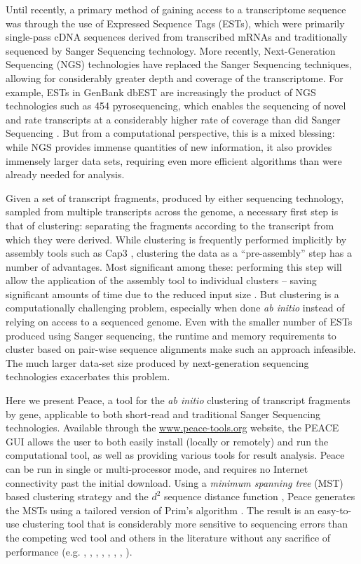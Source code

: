 \documentclass[a4,center,fleqn]{NAR}
\begin{document}
Until recently, a primary method of gaining access to a transcriptome
sequence was through the use of Expressed Sequence Tags (ESTs), which
were primarily single-pass cDNA sequences derived from transcribed
mRNAs and traditionally sequenced by Sanger Sequencing technology.
More recently, Next-Generation Sequencing (NGS) technologies have
replaced the Sanger Sequencing techniques, allowing for considerably
greater depth and coverage of the transcriptome.  For example, ESTs in
GenBank dbEST are increasingly the product of NGS technologies such as
454 pyrosequencing, which enables the sequencing of novel and rate
transcripts at a considerably higher rate of coverage than did Sanger
Sequencing \cite{Cheung2006,Emrich2007}.  But from a computational
perspective, this is a mixed blessing: while NGS provides immense
quantities of new information, it also provides immensely larger data sets,
requiring even more efficient algorithms than were already needed
for analysis.

Given a set of transcript fragments, produced by either sequencing
technology, sampled from multiple transcripts across the genome, a
necessary first step is that of clustering: separating the fragments
according to the transcript from which they were derived.  While
clustering is frequently performed implicitly by assembly tools such
as {\sc Cap3} \cite{Huang99}, clustering the data as a
``pre-assembly'' step has a number of advantages.  Most significant
among these: performing this step will allow the application of the
assembly tool to individual clusters -- saving significant amounts of
time due to the reduced input size \cite{Hazelhurst08a}.  But
clustering is a computationally challenging problem, especially when
done {\it ab initio} instead of relying on access to a sequenced
genome.  Even with the smaller number of ESTs produced using Sanger
sequencing, the runtime and memory requirements to cluster based on
pair-wise sequence alignments make such an approach infeasible.  The
much larger data-set size produced by next-generation sequencing
technologies exacerbates this problem.

Here we present {\sc Peace}, a tool for the {\it ab initio} clustering
of transcript fragments by gene, applicable to both short-read and traditional
Sanger Sequencing technologies.  Available through the
\href{http://www.peace-tools.org}{www.peace-tools.org} website, the PEACE GUI allows the user
to both easily install (locally or remotely) and run the computational
tool, as well as providing various tools for result analysis. {\sc
  Peace} can be run in single or multi-processor mode, and requires no
Internet connectivity past the initial download.  Using a {\it minimum
  spanning tree} (MST) based clustering strategy \cite{Jain99,Wan08}
and the $d^2$ sequence distance function \cite{Hide94}, {\sc Peace}
generates the MSTs using a tailored version of Prim's algorithm
\cite{Prim57}.  The result is an easy-to-use clustering tool that is considerably
more sensitive to sequencing errors than the competing {\sc wcd} tool
\cite{Hazelhurst08a} and others in the literature without any
sacrifice of performance (e.g. \cite{Burke99}, \cite{Slater00},
\cite{Huang99}, \cite{Parkinson02}, \cite{Kalyanaraman03},
\cite{Malde03}, \cite{Ptitsyn05}, \cite{Picardi09}).
\end{document}
